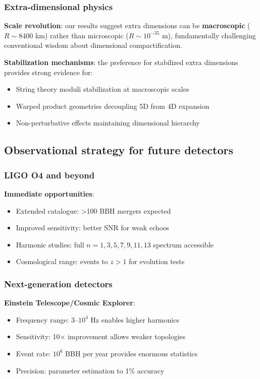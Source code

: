 \documentclass[12pt]{iopart}
\begin{document}
\subsubsection{Extra-dimensional physics}

\textbf{Scale revolution}: our results suggest extra dimensions can be \textbf{macroscopic} ($R \sim 8400$ km) rather than microscopic ($R \sim 10^{-35}$ m), fundamentally challenging conventional wisdom about dimensional compactification.

\textbf{Stabilization mechanisms}: the preference for stabilized extra dimensions provides strong evidence for:
\begin{itemize}
\item String theory moduli stabilization at macroscopic scales
\item Warped product geometries decoupling 5D from 4D expansion
\item Non-perturbative effects maintaining dimensional hierarchy
\end{itemize}

\subsection{Observational strategy for future detectors}

\subsubsection{LIGO O4 and beyond}

\textbf{Immediate opportunities}:
\begin{itemize}
\item Extended catalogue: >100 BBH mergers expected
\item Improved sensitivity: better SNR for weak echoes
\item Harmonic studies: full $n=1,3,5,7,9,11,13$ spectrum accessible
\item Cosmological range: events to $z>1$ for evolution tests
\end{itemize}

\subsubsection{Next-generation detectors}

\textbf{Einstein Telescope/Cosmic Explorer}:
\begin{itemize}
\item Frequency range: 3--$10^4$ Hz enables higher harmonics
\item Sensitivity: 10$\times$ improvement allows weaker topologies
\item Event rate: $10^6$ BBH per year provides enormous statistics
\item Precision: parameter estimation to 1\% accuracy
\end{itemize}
\end{document}
